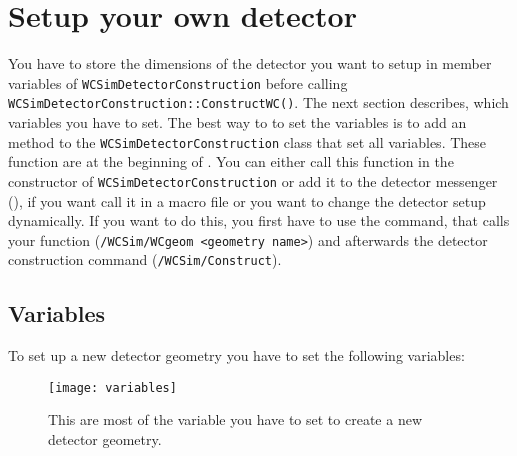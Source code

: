 
\section{Setup your own detector}

You have to store the dimensions of the detector you want to setup in member variables of  \texttt{WCSimDetectorConstruction} before calling  \texttt{WCSimDetectorConstruction::ConstructWC()}. The next section describes, which variables you have to set. The best way to to set the variables is to add an method to the \texttt{WCSimDetectorConstruction} class that set all variables. These function are at the beginning of .
You can either call this function in the constructor of \texttt{WCSimDetectorConstruction} or add it to the detector messenger (), if you want call it in a macro file or you want to change the detector setup dynamically. If you want to do this, you first have to use the command, that calls your function (\texttt{/WCSim/WCgeom <geometry name>}) and afterwards the detector construction command (\texttt{/WCSim/Construct}).

\subsection{Variables}
To set up a new detector geometry you have to set the following variables:

\begin{figure}
  \begin{center}
\texttt{[image: variables]}
  \end{center}
\caption{This are most of the variable you have to set to create a new detector geometry.}
\end{figure}


